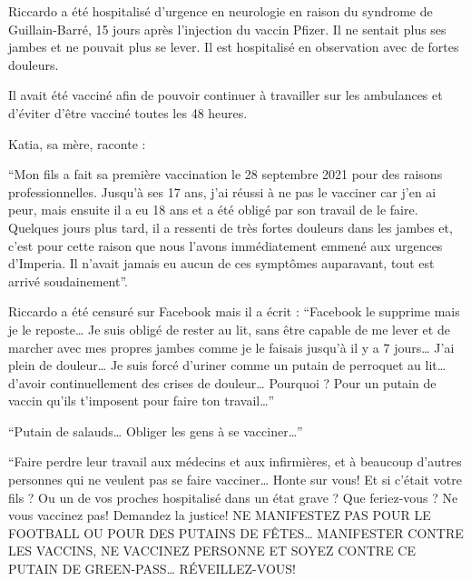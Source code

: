 Riccardo a été hospitalisé d'urgence en neurologie en raison du syndrome de
Guillain-Barré, 15 jours après l'injection du vaccin Pfizer. Il ne sentait plus
ses jambes et ne pouvait plus se lever. Il est hospitalisé en observation avec
de fortes douleurs.

Il avait été vacciné afin de pouvoir continuer à travailler sur les ambulances
et d'éviter d'être vacciné toutes les 48 heures.

Katia, sa mère, raconte :

“Mon fils a fait sa première vaccination le 28 septembre 2021 pour des raisons
professionnelles. Jusqu'à ses 17 ans, j'ai réussi à ne pas le vacciner car j'en
ai peur, mais ensuite il a eu 18 ans et a été obligé par son travail de le
faire. Quelques jours plus tard, il a ressenti de très fortes douleurs dans les
jambes et, c'est pour cette raison que nous l'avons immédiatement emmené aux
urgences d'Imperia. Il n'avait jamais eu aucun de ces symptômes auparavant, tout
est arrivé soudainement”.

Riccardo a été censuré sur Facebook mais il a écrit : “Facebook le supprime mais
je le reposte… Je suis obligé de rester au lit, sans être capable de me lever et
de marcher avec mes propres jambes comme je le faisais jusqu'à il y a 7 jours…
J'ai plein de douleur… Je suis forcé d'uriner comme un putain de perroquet au
lit… d'avoir continuellement des crises de douleur… Pourquoi ? Pour un putain de
vaccin qu'ils t'imposent pour faire ton travail…”

“Putain de salauds… Obliger les gens à se vacciner…”

“Faire perdre leur travail aux médecins et aux infirmières, et à beaucoup
d'autres personnes qui ne veulent pas se faire vacciner… Honte sur vous! Et si
c'était votre fils ? Ou un de vos proches hospitalisé dans un état grave ? Que
feriez-vous ? Ne vous vaccinez pas! Demandez la justice! NE MANIFESTEZ PAS POUR
LE FOOTBALL OU POUR DES PUTAINS DE FÊTES… MANIFESTER CONTRE LES VACCINS, NE
VACCINEZ PERSONNE ET SOYEZ CONTRE CE PUTAIN DE GREEN-PASS… RÉVEILLEZ-VOUS!

